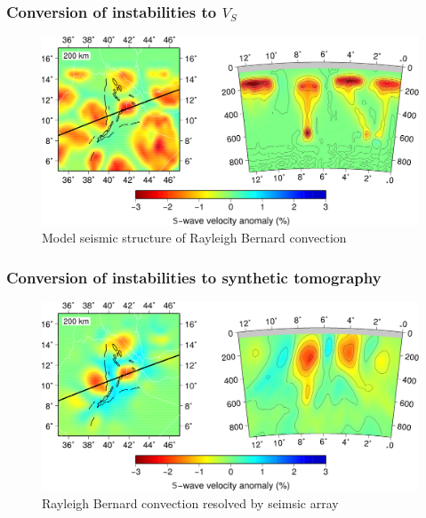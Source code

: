 \documentclass[aspectratio=169]{beamer}
\begin{document}
\begin{frame}
    \frametitle{Conversion of instabilities to $V_{S}$}
    \begin{figure}
        \includegraphics[width=0.85\paperwidth]{./figures/Newt200/input.png}
        \caption{Model seismic structure of Rayleigh Bernard convection}
    \end{figure}
\end{frame}

\begin{frame}
    \frametitle{Conversion of instabilities to synthetic tomography}
    \begin{figure}
        \includegraphics[width=0.85\paperwidth]{./figures/Newt200/output_damp.png}
        \caption{Rayleigh Bernard convection resolved by seimsic array}
    \end{figure}
\end{frame}
\end{document}
